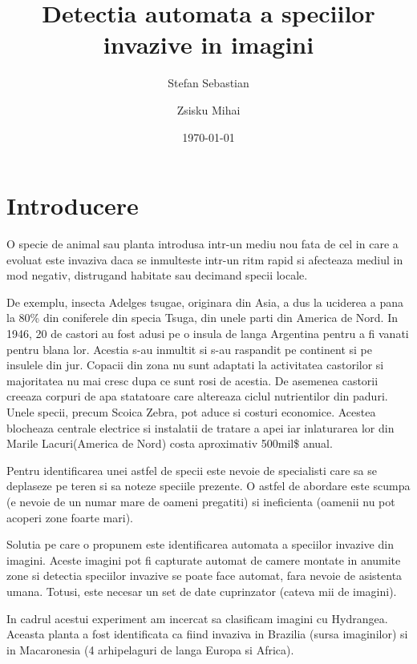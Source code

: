 \documentclass{article}
\begin{document}
\title{Detectia automata a speciilor invazive in imagini}
\author{Stefan Sebastian \and Zsisku Mihai}
\date{\today}
\maketitle

\newpage

\tableofcontents

\newpage

\section{Introducere}
O specie de animal sau planta introdusa intr-un mediu nou fata de cel in care a evoluat este invaziva daca se inmulteste intr-un ritm rapid si afecteaza mediul in mod negativ, distrugand habitate sau decimand specii locale\cite{WEBSITE:1}.
 
De exemplu, insecta Adelges tsugae, originara din Asia, a dus la uciderea a pana la 80\% din coniferele din specia Tsuga, din unele parti din America de Nord\cite{WEBSITE:2}. In 1946, 20 de castori au fost adusi pe o insula de langa Argentina pentru a fi vanati pentru blana lor. Acestia s-au inmultit si s-au raspandit pe continent si pe insulele din jur. Copacii din zona nu sunt adaptati la activitatea castorilor si majoritatea nu mai cresc dupa ce sunt rosi de acestia. De asemenea castorii creeaza corpuri de apa statatoare care altereaza ciclul nutrientilor din paduri\cite{WEBSITE:3}. Unele specii, precum Scoica Zebra, pot aduce si costuri economice. Acestea blocheaza centrale electrice si instalatii de tratare a apei iar inlaturarea lor din Marile Lacuri(America de Nord) costa aproximativ 500mil\$ anual\cite{WEBSITE:5}.

Pentru identificarea unei astfel de specii este nevoie de specialisti care sa se deplaseze pe teren si sa noteze speciile prezente. O astfel de abordare este scumpa (e nevoie de un numar mare de oameni pregatiti) si ineficienta (oamenii nu pot acoperi zone foarte mari).

Solutia pe care o propunem este identificarea automata a speciilor invazive din imagini. Aceste imagini pot fi capturate automat de camere montate in anumite zone si detectia speciilor invazive se poate face automat, fara nevoie de asistenta umana. Totusi, este necesar un set de date cuprinzator (cateva mii de imagini).

In cadrul acestui experiment am incercat sa clasificam imagini cu Hydrangea. Aceasta planta a fost identificata ca fiind invaziva in Brazilia (sursa imaginilor) si in Macaronesia (4 arhipelaguri de langa Europa si Africa)\cite{BOOK:1}.
\end{document}
